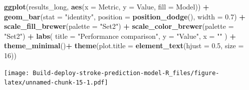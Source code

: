 \documentclass[
]{article}
\newenvironment{Shaded}{\begin{snugshade}}{\end{snugshade}}
\newcommand{\AttributeTok}[1]{\textcolor[rgb]{0.13,0.29,0.53}{#1}}
\newcommand{\DecValTok}[1]{\textcolor[rgb]{0.00,0.00,0.81}{#1}}
\newcommand{\FloatTok}[1]{\textcolor[rgb]{0.00,0.00,0.81}{#1}}
\newcommand{\FunctionTok}[1]{\textcolor[rgb]{0.13,0.29,0.53}{\textbf{#1}}}
\newcommand{\NormalTok}[1]{#1}
\newcommand{\OtherTok}[1]{\textcolor[rgb]{0.56,0.35,0.01}{#1}}
\newcommand{\SpecialCharTok}[1]{\textcolor[rgb]{0.81,0.36,0.00}{\textbf{#1}}}
\newcommand{\StringTok}[1]{\textcolor[rgb]{0.31,0.60,0.02}{#1}}
\begin{document}
\begin{Shaded}
\begin{Highlighting}[]
\FunctionTok{ggplot}\NormalTok{(results\_long, }\FunctionTok{aes}\NormalTok{(}\AttributeTok{x =}\NormalTok{ Metric, }\AttributeTok{y =}\NormalTok{ Value, }\AttributeTok{fill =}\NormalTok{ Model)) }\SpecialCharTok{+}
  \FunctionTok{geom\_bar}\NormalTok{(}\AttributeTok{stat =} \StringTok{"identity"}\NormalTok{, }\AttributeTok{position =} \FunctionTok{position\_dodge}\NormalTok{(), }\AttributeTok{width =} \FloatTok{0.7}\NormalTok{) }\SpecialCharTok{+}
  \FunctionTok{scale\_fill\_brewer}\NormalTok{(}\AttributeTok{palette =} \StringTok{"Set2"}\NormalTok{) }\SpecialCharTok{+}
  \FunctionTok{scale\_color\_brewer}\NormalTok{(}\AttributeTok{palette =} \StringTok{"Set2"}\NormalTok{) }\SpecialCharTok{+}
  \FunctionTok{labs}\NormalTok{(}
    \AttributeTok{title =} \StringTok{"Performance comparison"}\NormalTok{,}
    \AttributeTok{y =} \StringTok{"Value"}\NormalTok{,}
    \AttributeTok{x =} \StringTok{""}
\NormalTok{  ) }\SpecialCharTok{+}
  \FunctionTok{theme\_minimal}\NormalTok{()}\SpecialCharTok{+}     
  \FunctionTok{theme}\NormalTok{(}\AttributeTok{plot.title =} \FunctionTok{element\_text}\NormalTok{(}\AttributeTok{hjust =} \FloatTok{0.5}\NormalTok{, }\AttributeTok{size =} \DecValTok{16}\NormalTok{))}
\end{Highlighting}
\end{Shaded}

\texttt{[image: Build-deploy-stroke-prediction-model-R\_files/figure-latex/unnamed-chunk-15-1.pdf]}

\begin{Shaded}
\end{Shaded}
\end{document}
